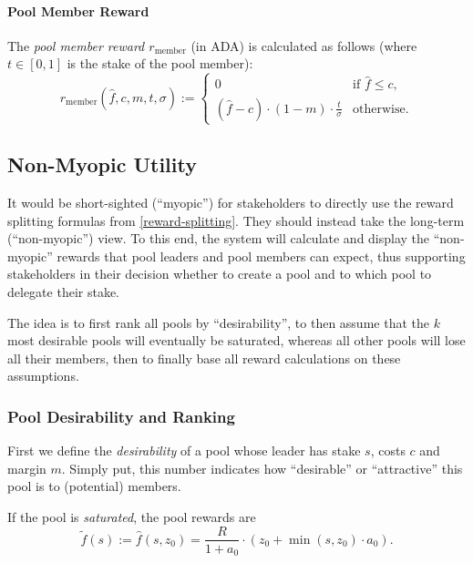 \documentclass[11pt,a4paper]{article}
\begin{document}
\paragraph{Pool Member Reward}
\label{pool-member-reward}

The \emph{pool member reward \(r_\mathrm{member}\)} (in ADA) is
calculated as follows (where \(t\in[0,1]\) is the stake of the pool
member): \[
    r_\mathrm{member}(\hat{f}, c, m, t, \sigma) :=
    \left\{
    \begin{array}{ll}
        \displaystyle 0 &
        \text{if $\hat{f}\leq c$,} \\
        \displaystyle (\hat{f} - c)\cdot(1-m)\cdot\frac{t}{\sigma} &
        \text{otherwise.}
    \end{array}
    \right.
\]

\subsection{Non-Myopic Utility}
\label{non-myopic-utility}

It would be short-sighted (``myopic'') for stakeholders to directly use
the reward splitting formulas from \cref{reward-splitting}.
They should instead take the long-term (``non-myopic'') view. To this
end, the system will calculate and display the ``non-myopic'' rewards
that pool leaders and pool members can expect, thus supporting
stakeholders in their decision whether to create a pool and to which
pool to delegate their stake.

The idea is to first rank all pools by ``desirability'', to then assume
that the \(k\) most desirable pools will eventually be saturated,
whereas all other pools will lose all their members, then to finally
base all reward calculations on these assumptions.

\subsubsection{Pool Desirability and Ranking}
\label{pool-desirability-and-ranking}

First we define the \emph{desirability} of a pool whose leader has stake
\(s\), costs \(c\) and margin \(m\). Simply put, this number indicates
how ``desirable'' or ``attractive'' this pool is to (potential) members.

If the pool is \emph{saturated}, the pool rewards are \[
    \tilde{f}(s) :=
    \hat{f}(s,z_0)=
    \frac{R}{1 + a_0}
    \cdot
    \left(z_0 + \min(s,z_0)\cdot a_0\right).
\]
\end{document}
